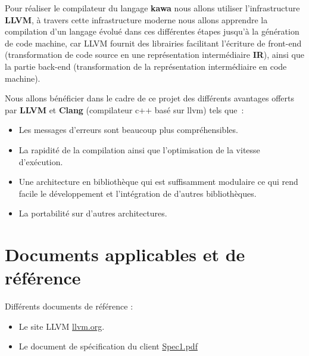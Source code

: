 \documentclass{../res/univ-projet}
\begin{document}
Pour réaliser le compilateur du langage \textbf {kawa} nous allons utiliser l'infrastructure \textbf {LLVM}, à travers cette infrastructure moderne nous allons apprendre la compilation d'un langage évolué dans ces différentes étapes jusqu'à la génération de code machine, car LLVM fournit des librairies facilitant l’écriture de front-end (transformation de code source en une représentation intermédiaire \textbf {IR}), ainsi que la partie  back-end (transformation de la représentation intermédiaire en code machine).

Nous allons  bénéficier dans le cadre de ce projet des différents avantages offerts par \textbf {LLVM} et \textbf {Clang} (compilateur c++ basé sur llvm) tels que :
\begin{itemize}
\item Les messages d’erreurs sont beaucoup plus compréhensibles.
\item La rapidité de la compilation ainsi que l'optimisation de la vitesse d'exécution.
\item Une architecture en bibliothèque qui est suffisamment modulaire ce qui rend facile le développement et l'intégration de d'autres bibliothèques.
\item La portabilité sur d'autres architectures.
\end{itemize}


\section{Documents applicables et de référence}
Différents documents de référence :
\begin{itemize}

\item Le site LLVM \href{http://llvm.org}{llvm.org}.
\item Le document de spécification du client \href{file:../client/spec1.pdf}{Spec1.pdf}
\end{itemize}
\end{document}
